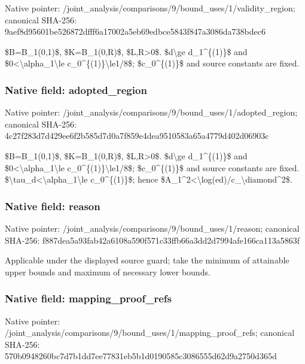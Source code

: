 \documentclass[10pt,a4paper]{article}
\begin{document}
Native pointer: /joint\_analysis/comparis\allowbreak{}ons/9/bound\_uses/1/valid\allowbreak{}ity\_region; canonical SHA-256: 9aef8d95601be526872dfff6\allowbreak{}a17002a5eb69edbce5843f84\allowbreak{}7a3086da738bdec6


\$B=B\_1(0,1)\$, \$K=B\_1(0,R)\$, \$L,R>0\$. \$d\textbackslash{}ge d\_1\textasciicircum{}\{(1)\}\$ and \$0<\textbackslash{}alpha\_1\textbackslash{}le c\_0\textasciicircum{}\{(1)\}\textbackslash{}le1/8\$; \$c\_0\textasciicircum{}\{(1)\}\$ and source constants are fixed.


\subsubsection{Native field: adopted\_region}


Native pointer: /joint\_analysis/comparis\allowbreak{}ons/9/bound\_uses/1/adopt\allowbreak{}ed\_region; canonical SHA-256: 4c27f283d7d429ee6f2b585d\allowbreak{}7d0a7f859e4dea9510583a65\allowbreak{}a4779d402d06903c


\$B=B\_1(0,1)\$, \$K=B\_1(0,R)\$, \$L,R>0\$. \$d\textbackslash{}ge d\_1\textasciicircum{}\{(1)\}\$ and \$0<\textbackslash{}alpha\_1\textbackslash{}le c\_0\textasciicircum{}\{(1)\}\textbackslash{}le1/8\$; \$c\_0\textasciicircum{}\{(1)\}\$ and source constants are fixed. \$\textbackslash{}tau\_d<\textbackslash{}alpha\_1\textbackslash{}le c\_0\textasciicircum{}\{(1)\}\$; hence \$A\_1\textasciicircum{}2<\textbackslash{}log(ed)/c\_\textbackslash{}diamond\textasciicircum{}2\$.


\subsubsection{Native field: reason}


Native pointer: /joint\_analysis/comparis\allowbreak{}ons/9/bound\_uses/1/reaso\allowbreak{}n; canonical SHA-256: f887dea5a93fab42a6108a59\allowbreak{}0f571c33ffb66a3dd2d7994a\allowbreak{}fe166ca113a5863f


Applicable under the displayed source guard; take the minimum of attainable upper bounds and maximum of necessary lower bounds.


\subsubsection{Native field: mapping\_proof\_refs}


Native pointer: /joint\_analysis/comparis\allowbreak{}ons/9/bound\_uses/1/mappi\allowbreak{}ng\_proof\_refs; canonical SHA-256: 570b0948260bc7d7b1dd7ee7\allowbreak{}7831eb5b1d0190585c308655\allowbreak{}5d62d9a2750d365d
\end{document}

